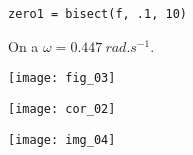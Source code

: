 \begin{multicols}{2}
\begin{corrige}
\begin{itemize}
\begin{lstlisting}
zero1 = bisect(f, .1, 10)
\end{lstlisting}
On a $\omega=\SI{0,447}{rad.s^{-1}}$.
\end{itemize}

\end{corrige}
\else
\fi



\ifprof
\else
\end{multicols}
\fi



\ifprof
\else

\begin{center}
\texttt{[image: fig\_03]}
\end{center}

\fi


\ifprof
\begin{center}
\texttt{[image: cor\_02]}
\end{center}

\else
\fi



\ifprof
\else
\begin{center}
\texttt{[image: img\_04]}
\end{center}
\fi

%
%
%


